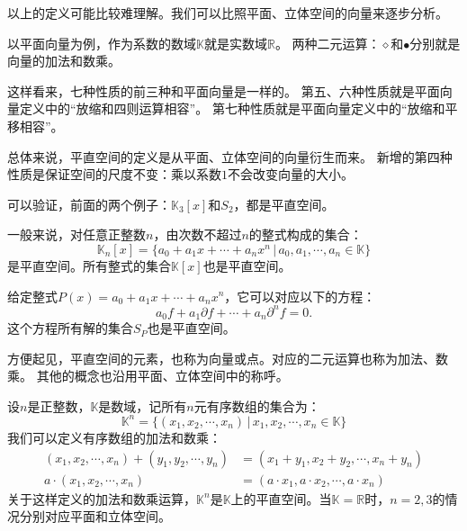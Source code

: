 \documentclass[12pt,UTF8]{ctexbook}
\theoremstyle{definition}
\theoremstyle{plain}
\begin{document}
以上的定义可能比较难理解。我们可以比照平面、立体空间的向量来逐步分析。

以平面向量为例，作为系数的数域$\mathbb{K}$就是实数域$\mathbb{R}$。
两种二元运算：$\diamond$和$\bullet$分别就是向量的加法和数乘。

这样看来，七种性质的前三种和平面向量是一样的。
第五、六种性质就是平面向量定义中的“放缩和四则运算相容”。
第七种性质就是平面向量定义中的“放缩和平移相容”。

总体来说，平直空间的定义是从平面、立体空间的向量衍生而来。
新增的第四种性质是保证空间的尺度不变：乘以系数$1$不会改变向量的大小。

可以验证，前面的两个例子：$\mathbb{K}_3[x]$和$S_2$，都是平直空间。

一般来说，对任意正整数$n$，由次数不超过$n$的整式构成的集合：
$$ \mathbb{K}_n[x] = \{a_0 + a_1 x + \cdots + a_n x^n \, | \, a_0, a_1, \cdots , a_n \in \mathbb{K}\} $$
是平直空间。所有整式的集合$\mathbb{K}[x]$也是平直空间。

给定整式$P(x) = a_0 + a_1 x + \cdots + a_n x^n$，它可以对应以下的方程：
$$ a_0 f + a_1 \partial f + \cdots + a_n \partial^n f = 0. $$
这个方程所有解的集合$S_P$也是平直空间。

方便起见，平直空间的元素，也称为向量或点。对应的二元运算也称为加法、数乘。
其他的概念也沿用平面、立体空间中的称呼。

设$n$是正整数，$\mathbb{K}$是数域，记所有$n$元有序数组的集合为：
$$ \mathbb{K}^n = \{(x_1, x_2, \cdots , x_n) \, | \, x_1, x_2, \cdots , x_n \in \mathbb{K}\}$$
我们可以定义有序数组的加法和数乘：
\begin{align*}
    (x_1, x_2, \cdots , x_n) + (y_1, y_2, \cdots , y_n) &= (x_1 + y_1, x_2 + y_2, \cdots , x_n + y_n) \\
    a\cdot (x_1, x_2, \cdots , x_n) &= (a\cdot x_1, a\cdot x_2, \cdots , a\cdot x_n)
\end{align*}
关于这样定义的加法和数乘运算，$\mathbb{K}^n$是$\mathbb{K}$上的平直空间。当$\mathbb{K}=\mathbb{R}$时，$n=2,3$的情况分别对应平面和立体空间。
\end{document}
